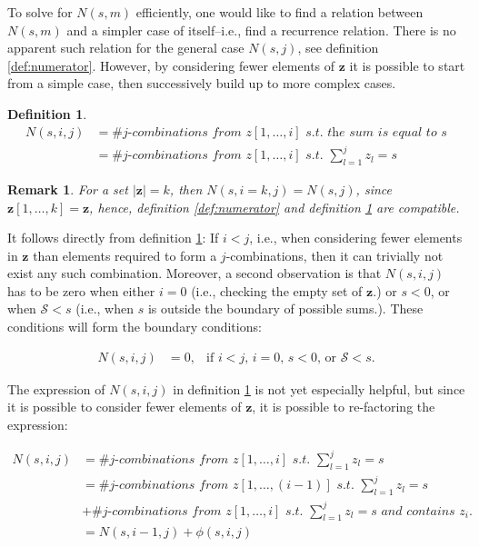 \documentclass[a4paper]{article}
\newtheorem{mydef}{Definition}
\newtheorem{myremark}{Remark}
\begin{document}
To solve for $N(s,m)$ efficiently, one would like to find a relation between $N(s,m)$ and a simpler case of itself–i.e., find a recurrence relation. There is no apparent such relation for the general case $N(s,j)$, see definition \ref{def:numerator}. However, by considering fewer elements of $\bm{z}$ it is possible to start from a simple case, then successively build up to more complex cases.

\begin{mydef}
\label{def:specificNumerator}
\begin{align*}
N(s,i,j)&=\textit{\# j-combinations from $z[1,\ldots,i]$ s.t. the sum is equal to $s$}\\
        &=\textit{\# j-combinations from $z[1,\ldots,i]$ s.t. $\sum _{l=1}^{j}z_{l}=s$}
\end{align*}
\end{mydef}
\begin{myremark}
\label{rm:finalN}
For a set $|\bm{z}|=k$, then $N(s,i=k,j)=N(s,j)$, since $\bm{z}[1,\ldots,k]=\bm{z}$, hence, definition \ref{def:numerator} and definition \ref{def:specificNumerator} are compatible.
\end{myremark}

It follows directly from definition \ref{def:specificNumerator}: If $i<j$, i.e., when considering fewer elements in $\bm{z}$ than elements required to form a $j$-combinations, then it can trivially not exist any such combination. Moreover, a second observation is that $N(s,i,j)$ has to be zero when either $i=0$ (i.e., checking the empty set of $\bm{z}$.) or $s < 0$, or when $\mathcal{S} < s$ (i.e., when $s$ is outside the boundary of possible sums.). These conditions will form the boundary conditions:

\begin{align}
\label{eq:Subrecursion1}
N(s,i,j) &=0, & \text{if $i < j$, $i=0$, $s < 0$, or $\mathcal{S} < s$.}
\end{align}

The expression of $N(s,i,j)$ in definition \ref{def:specificNumerator} is not yet especially helpful, but since it is possible to consider fewer elements of $\bm{z}$, it is possible to re-factoring the expression:

\begin{align*}
N(s,i,j) &= \textit{\# $j$-combinations from $z[1,\ldots,i]$ s.t. $\sum _{l=1}^{j}z_{l}=s$} \\
        &= \textit{\# $j$-combinations from $z[1,\ldots,(i-1)]$ s.t. $\sum _{l=1}^{j}z_{l}=s$} \\
        &+ \textit{\# $j$-combinations from $z[1,\ldots,i]$ s.t. $\sum _{l=1}^{j}z_{l}=s$ and contains $z_{i}$.} \\
        &= N(s,i-1,j)+ \phi (s,i,j) \\
\end{align*}
\end{document}
